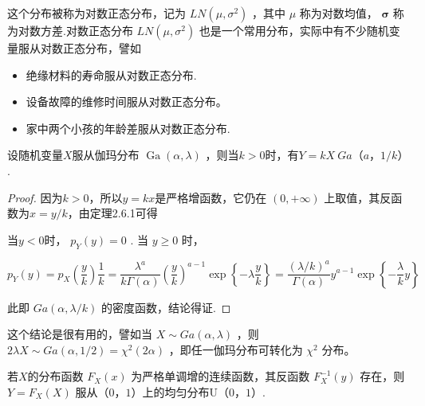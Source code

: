这个分布被称为对数正态分布，记为 $L N\left(\mu, \sigma^{2}\right)$ ，其中 $\mu$ 称为对数均值， $\mathbf{\sigma}$ 称为对数方差.对数正态分布 $L N\left(\mu, \sigma^{2}\right)$ 也是一个常用分布，实际中有不少随机变量服从对数正态分布，譬如

\begin{itemize}
	\item 绝缘材料的寿命服从对数正态分布.
	\item 设备故障的维修时间服从对数正态分布。
	\item 家中两个小孩的年龄差服从对数正态分布.
\end{itemize}

\begin{theorem}
	设随机变量$ X $服从伽玛分布 $\operatorname{Ga}(\alpha, \lambda)$ ，则当$ k>0 $时，有$ Y=kX~Ga（a，1/k） $.
\end{theorem}

\begin{proof}
	因为$ k>0 $，所以$ y=kx $是严格增函数，它仍在 $(0,+\infty)$ 上取值，其反函数为$ x=y/k $，由定理2.6.1可得
	
	当$ y<0 $时， $p_{Y}(y)=0$ .
	当 $y \geqslant 0$ 时，
	
	\[
	p_{Y}(y)=p_{X}\left(\frac{y}{k}\right) \frac{1}{k}=\frac{\lambda^{a}}{k \Gamma(\alpha)}\left(\frac{y}{k}\right)^{a-1} \exp \left\{-\lambda \frac{y}{k}\right\}=\frac{(\lambda / k)^{a}}{\Gamma(\alpha)} y^{a-1} \exp \left\{-\frac{\lambda}{k} y\right\}
	\]
	
	此即 $G a(\alpha, \lambda / k)$ 的密度函数，结论得证.
\end{proof}

这个结论是很有用的，譬如当 $X \sim G a(\alpha, \lambda)$ ，则 $2 \lambda X \sim G a(\alpha, 1 / 2)= \chi^{2}(2 \alpha) $ ，即任一伽玛分布可转化为 $\chi^{2}$ 分布。

\begin{theorem}{}{}
	若$ X $的分布函数 $F_{X}(x)$ 为严格单调增的连续函数，其反函数 $F_{X}^{-1}(y)$ 存在，则 $Y=F_{X}(X)$ 服从$ （0，1） $上的均匀分布U$ （0，1） $.
\end{theorem}

